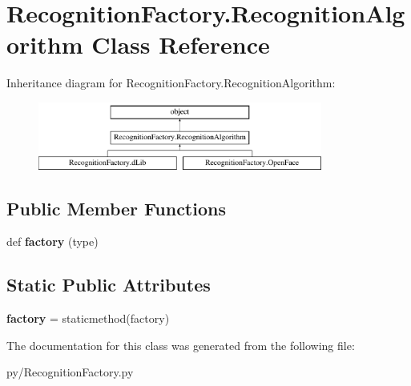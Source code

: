 \hypertarget{classRecognitionFactory_1_1RecognitionAlgorithm}{}\section{Recognition\+Factory.\+Recognition\+Algorithm Class Reference}
\label{classRecognitionFactory_1_1RecognitionAlgorithm}
Inheritance diagram for Recognition\+Factory.\+Recognition\+Algorithm\+:\begin{figure}[H]
\begin{center}
\leavevmode
\includegraphics[height=2.213439cm]{classRecognitionFactory_1_1RecognitionAlgorithm}
\end{center}
\end{figure}
\subsection*{Public Member Functions}
\begin{DoxyCompactItemize}
\item 
def {\bfseries factory} (type)\hypertarget{classRecognitionFactory_1_1RecognitionAlgorithm_ad2326cb89359b2ef4ddc8d1f303dbeb5}{}\label{classRecognitionFactory_1_1RecognitionAlgorithm_ad2326cb89359b2ef4ddc8d1f303dbeb5}

\end{DoxyCompactItemize}
\subsection*{Static Public Attributes}
\begin{DoxyCompactItemize}
\item 
{\bfseries factory} = staticmethod(factory)\hypertarget{classRecognitionFactory_1_1RecognitionAlgorithm_a27b91d46587fb0cc1856d1ce44f8fa78}{}\label{classRecognitionFactory_1_1RecognitionAlgorithm_a27b91d46587fb0cc1856d1ce44f8fa78}

\end{DoxyCompactItemize}


The documentation for this class was generated from the following file\+:\begin{DoxyCompactItemize}
\item 
py/Recognition\+Factory.\+py\end{DoxyCompactItemize}
